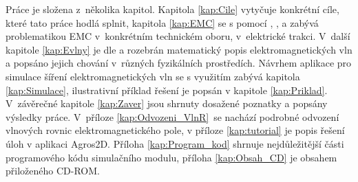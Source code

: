 Práce je složena z~několika kapitol. Kapitola \ref{kap:Cile} vytyčuje konkrétní cíle, které tato práce hodlá splnit, kapitola \ref{kap:EMC} se s pomocí \cite{emc_trakce}, \cite{nfr}, \cite{emc_encyklopedie} a \cite{csn} zabývá problematikou EMC v~konkrétním technickém oboru, v~elektrické trakci. V~další kapitole \ref{kap:Evlny} je dle \cite{emp} a \cite{umt} rozebrán matematický popis elektromagnetických vln a popsáno jejich chování v~různých fyzikálních prostředích. Návrhem aplikace pro simulace šíření elektromagnetických vln se s využitím \cite{hpfem} zabývá kapitola \ref{kap:Simulace}, ilustrativní příklad řešení je popsán v kapitole \ref{kap:Priklad}. V~závěrečné kapitole \ref{kap:Zaver} jsou shrnuty dosažené poznatky a popsány výsledky práce. V~příloze \ref{kap:Odvozeni_VlnR}~se nachází podrobné odvození vlnových rovnic elektromagnetického pole, v příloze \ref{kap:tutorial} je popis řešení úloh v aplikaci Agros2D. Příloha \ref{kap:Program_kod} shrnuje nejdůležitější části programového kódu simulačního modulu, příloha \ref{kap:Obsah_CD} je obsahem přiloženého CD-ROM.

